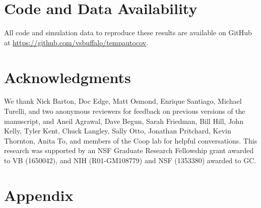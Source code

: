 \documentclass[11pt]{article}
\begin{document}
\section{Code and Data Availability}

All code and simulation data to reproduce these results are available on GitHub
at \url{https://github.com/vsbuffalo/tempautocov}.

\section{Acknowledgments}

We thank Nick Barton, Doc Edge, Matt Osmond, Enrique Santiago, Michael Turelli,
and two anonymous reviewers for feedback on previous versions of the
manuscript, and Aneil Agrawal, Dave Begun, Sarah Friedman, Bill Hill, John
Kelly, Tyler Kent, Chuck Langley, Sally Otto, Jonathan Pritchard, Kevin
Thornton, Anita To, and members of the Coop lab for helpful conversations.
This research was supported by an NSF Graduate Research Fellowship grant
awarded to VB (1650042), and NIH (R01-GM108779) and NSF (1353380) awarded to
GC.

%
\printbibliography


\newpage


\appendix

\section{Appendix} 
\setcounter{figure}{0}    
\end{document}
